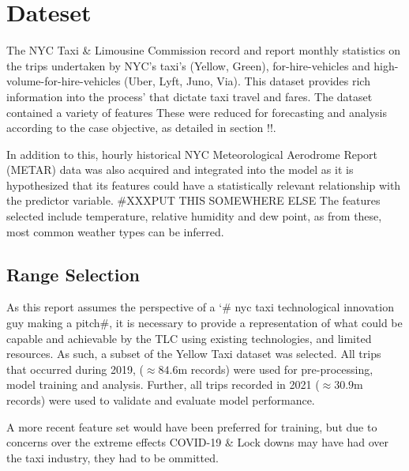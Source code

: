 \documentclass[11pt]{article}
\begin{document}
\section{Dateset}

The NYC Taxi \& Limousine Commission record and report monthly statistics \cite{nyctlc}  on the trips undertaken by NYC's taxi’s (Yellow, Green), for-hire-vehicles and high-volume-for-hire-vehicles (Uber, Lyft, Juno, Via). 
This dataset provides rich information into the process’ that dictate taxi travel and fares.
The dataset contained a variety of features These were reduced for forecasting and analysis according to the case objective, as detailed in section !!.  

In addition to this, hourly historical NYC Meteorological Aerodrome Report (METAR) \cite{metar} data was also acquired and integrated into the model as it is hypothesized that its features could have a statistically relevant relationship with the predictor variable. \#XXXPUT THIS SOMEWHERE ELSE 
The features selected include temperature, relative humidity and dew point, as from these, most common weather types can be inferred.

\subsection{Range Selection}
As this report assumes the perspective of a ‘\# nyc taxi technological innovation guy making a pitch\#, it is necessary to provide a representation of what could be capable and achievable by the TLC using existing technologies, and limited resources.
As such, a subset of the Yellow Taxi dataset was selected. All trips that occurred during 2019, ($\approx 84.6$m records) were used for pre-processing, model training and analysis. Further, all trips recorded in 2021 ($\approx 30.9$m records) were used to validate and evaluate model performance. 

A more recent feature set would have been preferred for training, but due to concerns over the extreme effects COVID-19 \& Lock downs may have had over the taxi industry, they had to be ommitted.
\end{document}
